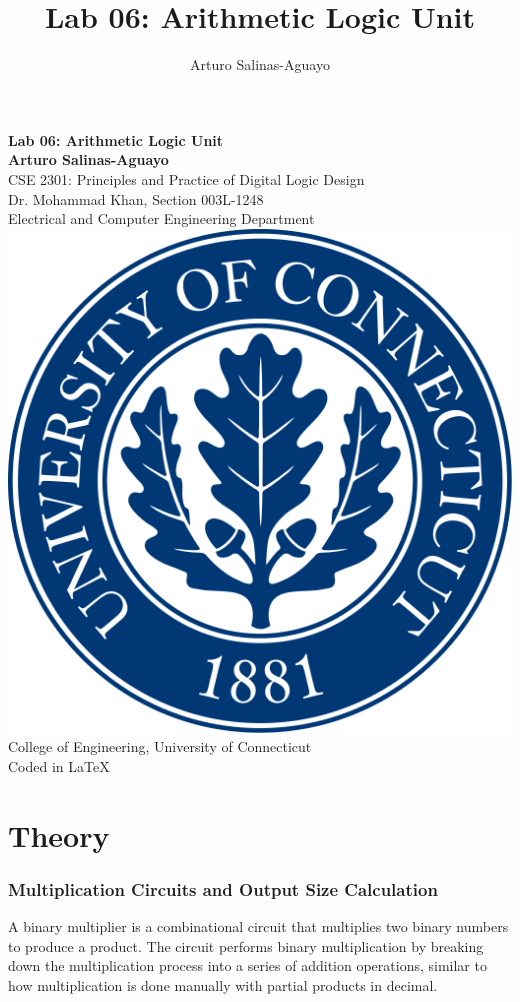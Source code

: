 \documentclass[12pt]{article}
\author{Arturo Salinas-Aguayo}
\title{Lab 06: Arithmetic Logic Unit}
\begin{document}
\newcommand{\closure}[2][3]{%
	{}\mkern#1mu\overline{\mkern-#1mu#2}}
\newcommand\ncoverline[1]{\mkern1mu\overline{\mkern-1mu#1\mkern-1mu}\mkern1mu}
\begin{titlepage}
	\centering
	\vspace*{3cm}
	\huge\textbf{Lab 06: Arithmetic Logic Unit}\\
	\vspace{5cm}
	\Large\textbf{Arturo Salinas-Aguayo}\\
	\normalsize
	CSE 2301: Principles and Practice of Digital Logic Design\\
	Dr. Mohammad Khan, Section 003L-1248\\
	Electrical and Computer Engineering Department
	\vfill
	\includegraphics[scale=0.1]{uconnlogo}\\
	College of Engineering, University of Connecticut\\
	\scriptsize{Coded in \LaTeX}
	\vspace*{1cm}
\end{titlepage}
\section*{Theory}
\subsubsection*{Multiplication Circuits and Output Size Calculation}
A binary multiplier is a combinational circuit that multiplies two binary numbers to produce a product. The circuit performs binary multiplication by breaking down the multiplication process into a series of addition operations, similar to how multiplication is done manually with partial products in decimal.
\end{document}
